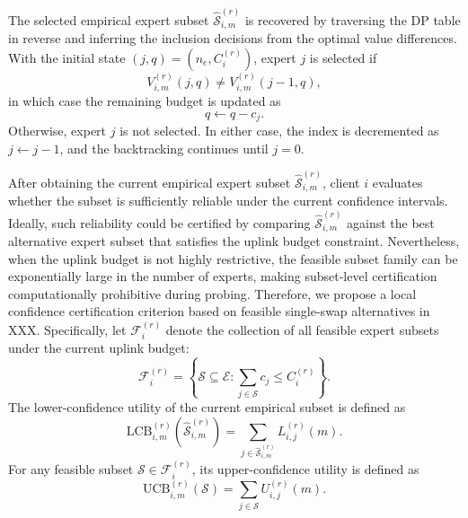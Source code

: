 \documentclass[conference]{IEEEtran}
\newcommand{\xxx}{XXX}%
\begin{document}
The selected empirical expert subset $\widehat{\mathcal{S}}_{i,m}^{(r)}$ is recovered by traversing the DP table in reverse and inferring the inclusion decisions from the optimal value differences. With the initial state $(j,q)=(n_e,C_i^{(r)})$, expert $j$ is selected if
\begin{equation}
\label{eq:dp_backtracking_condition_xxx}
V_{i,m}^{(r)}(j,q)
\neq
V_{i,m}^{(r)}(j-1,q),
\end{equation}
in which case the remaining budget is updated as
\begin{equation}
\label{eq:dp_backtracking_budget_update_xxx}
q \leftarrow q-c_j .
\end{equation}
Otherwise, expert $j$ is not selected. In either case, the index is decremented as $j \leftarrow j-1$, and the backtracking continues until $j=0$.

After obtaining the current empirical expert subset 
$\widehat{\mathcal{S}}_{i,m}^{(r)}$, client $i$ evaluates whether the subset is sufficiently reliable under the current confidence intervals. Ideally, such reliability could be certified by comparing $\widehat{\mathcal{S}}_{i,m}^{(r)}$ against the best alternative expert subset that satisfies the uplink budget constraint. Nevertheless, when the uplink budget is not highly restrictive, the feasible subset family can be exponentially large in the number of experts, making subset-level certification computationally prohibitive during probing. Therefore, we propose a local confidence certification criterion based on feasible single-swap alternatives in \xxx. Specifically, let $\mathcal{F}_i^{(r)}$ denote the collection of all feasible expert subsets under the current uplink budget:
\begin{equation}
\label{eq:feasible_subset_family_xxx}
\mathcal{F}_i^{(r)}
=
\left\{
\mathcal{S}\subseteq \mathcal{E}
:
\sum_{j\in\mathcal{S}} c_j
\leq C_i^{(r)}
\right\}.
\end{equation}
The lower-confidence utility of the current empirical subset is defined as
\begin{equation}
\label{eq:selected_subset_lcb_xxx}
\mathrm{LCB}_{i,m}^{(r)}
\left(
\widehat{\mathcal{S}}_{i,m}^{(r)}
\right)
=
\sum_{j\in \widehat{\mathcal{S}}_{i,m}^{(r)}}
L_{i,j}^{(r)}(m).
\end{equation}
For any feasible subset $\mathcal{S}\in \mathcal{F}_i^{(r)}$, its upper-confidence utility is defined as
\begin{equation}
\label{eq:competing_subset_ucb_xxx}
\mathrm{UCB}_{i,m}^{(r)}(\mathcal{S})
=
\sum_{j\in \mathcal{S}}
U_{i,j}^{(r)}(m).
\end{equation}
\end{document}
